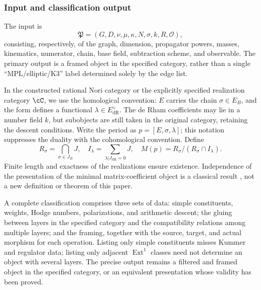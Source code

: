 \documentclass[11pt,a4paper,oneside]{article}
\theoremstyle{plain}
\theoremstyle{definition}
\theoremstyle{remark}
\newcommand{\dR}{\mathrm{dR}}
\numberwithin{equation}{section}
\begin{document}
\subsubsection{Input and classification output}
The input is
\[
 \mathfrak P=(G,D,\nu,\mu,\kappa,N,\sigma,k,R,\mathcal O),
\]
consisting, respectively, of the graph, dimension, propagator powers, masses, kinematics, numerator, chain, base field, subtraction scheme, and observable.
The primary output is a framed object in the specified category, rather than a single ``MPL/elliptic/K3'' label determined solely by the edge list.

In the constructed rational Nori category or the explicitly specified realization category $\cC$, we use the homological convention:
$E$ carries the chain $\sigma\in E_B$, and the form defines a functional $\lambda\in E_{\dR}^{\vee}$.
The de Rham coefficients may lie in a number field $k$, but subobjects are still taken in the original category, retaining the descent conditions.
Write the period as $p=[E,\sigma,\lambda]$; this notation suppresses the duality with the cohomological convention. Define
\[
 R_\sigma=\bigcap_{\sigma\in J_B}J,\quad
 I_\lambda=\sum_{\lambda|J_{\dR}=0}J,\quad
 M(p)=R_\sigma/(R_\sigma\cap I_\lambda).
\]
Finite length and exactness of the realizations ensure existence. Independence of the presentation of the minimal matrix-coefficient object is a classical result
\cite[\S2.4]{brownperiods}, not a new definition or theorem of this paper.

A complete classification comprises three sets of data: simple constituents, weights, Hodge numbers, polarizations, and arithmetic descent;
the gluing between layers in the specified category and the compatibility relations among multiple layers; and the framing, together with the source, target, and actual morphism for each operation.
Listing only simple constituents misses Kummer and regulator data; listing only adjacent $\operatorname{Ext}^1$
classes need not determine an object with several layers. The precise output remains a filtered and framed object in the specified category, or an equivalent presentation whose validity has been proved.
\end{document}

